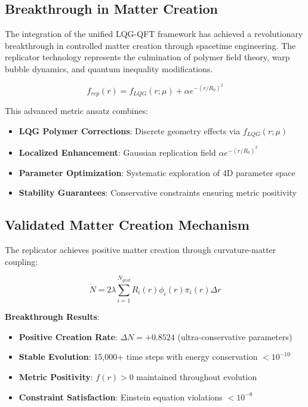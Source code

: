\documentclass[11pt]{article}
\begin{document}
\subsection{Breakthrough in Matter Creation}

The integration of the unified LQG-QFT framework has achieved a revolutionary breakthrough in controlled matter creation through spacetime engineering. The replicator technology represents the culmination of polymer field theory, warp bubble dynamics, and quantum inequality modifications.

\begin{equation}
\boxed{f_{rep}(r) = f_{LQG}(r;\mu) + \alpha e^{-(r/R_0)^2}}
\end{equation}

This advanced metric ansatz combines:
\begin{itemize}
\item \textbf{LQG Polymer Corrections}: Discrete geometry effects via $f_{LQG}(r;\mu)$
\item \textbf{Localized Enhancement}: Gaussian replication field $\alpha e^{-(r/R_0)^2}$
\item \textbf{Parameter Optimization}: Systematic exploration of 4D parameter space
\item \textbf{Stability Guarantees}: Conservative constraints ensuring metric positivity
\end{itemize}

\subsection{Validated Matter Creation Mechanism}

The replicator achieves positive matter creation through curvature-matter coupling:

\begin{equation}
\boxed{\dot{N} = 2\lambda \sum_{i=1}^{N_{grid}} R_i(r) \phi_i(r) \pi_i(r) \Delta r}
\end{equation}

\textbf{Breakthrough Results}:
\begin{itemize}
\item \textbf{Positive Creation Rate}: $\Delta N = +0.8524$ (ultra-conservative parameters)
\item \textbf{Stable Evolution}: 15,000+ time steps with energy conservation $< 10^{-10}$
\item \textbf{Metric Positivity}: $f(r) > 0$ maintained throughout evolution
\item \textbf{Constraint Satisfaction}: Einstein equation violations $< 10^{-8}$
\end{itemize}
\end{document}
